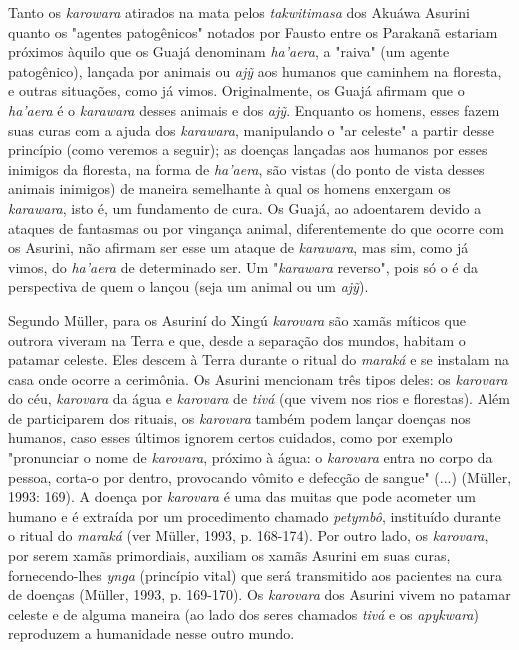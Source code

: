Tanto os \emph{karowara} atirados na mata pelos \emph{takwitimasa} dos
Akuáwa Asurini quanto os "agentes patogênicos" notados por Fausto entre
os Parakanã estariam próximos àquilo que os Guajá denominam
\emph{ha'aera}, a "raiva" (um agente patogênico), lançada por animais ou
\emph{ajỹ} aos humanos que caminhem na floresta, e outras situações,
como já vimos. Originalmente, os Guajá afirmam que o \emph{ha'aera} é o
\emph{karawara} desses animais e dos \emph{ajỹ}. Enquanto os homens,
esses fazem suas curas com a ajuda dos \emph{karawara}, manipulando o
"ar celeste" a partir desse princípio (como veremos a seguir); as
doenças lançadas aos humanos por esses inimigos da floresta, na forma de
\emph{ha'aera}, são vistas (do ponto de vista desses animais inimigos)
de maneira semelhante à qual os homens enxergam os \emph{karawara}, isto
é, um fundamento de cura. Os Guajá, ao adoentarem devido a ataques de
fantasmas ou por vingança animal, diferentemente do que ocorre com os
Asurini, não afirmam ser esse um ataque de \emph{karawara}, mas sim,
como já vimos, do \emph{ha'aera} de determinado ser. Um "\emph{karawara}
reverso", pois só o é da perspectiva de quem o lançou (seja um animal ou
um \emph{ajỹ}).

Segundo Müller, para os Asuriní do Xingú \emph{karovara} são xamãs
míticos que outrora viveram na Terra e que, desde a separação dos
mundos, habitam o patamar celeste. Eles descem à Terra durante o ritual
do \emph{maraká} e se instalam na casa onde ocorre a cerimônia. Os
Asurini mencionam três tipos deles: os \emph{karovara} do céu,
\emph{karovara} da água e \emph{karovara} de \emph{tivá} (que vivem nos
rios e florestas). Além de participarem dos rituais, os \emph{karovara}
também podem lançar doenças nos humanos, caso esses últimos ignorem
certos cuidados, como por exemplo "pronunciar o nome de \emph{karovara},
próximo à água: o \emph{karovara} entra no corpo da pessoa, corta-o por
dentro, provocando vômito e defecção de sangue" (...) (Müller, 1993:
169). A doença por \emph{karovara} é uma das muitas que pode acometer um
humano e é extraída por um procedimento chamado \emph{petymbô},
instituído durante o ritual do \emph{maraká} (ver Müller, 1993, p.
168-174). Por outro lado, os \emph{karovara}, por serem xamãs
primordiais, auxiliam os xamãs Asurini em suas curas, fornecendo-lhes
\emph{ynga} (princípio vital) que será transmitido aos pacientes na cura
de doenças (Müller, 1993, p. 169-170). Os \emph{karovara} dos Asurini
vivem no patamar celeste e de alguma maneira (ao lado dos seres chamados
\emph{tivá} e os \emph{apykwara}) reproduzem a humanidade nesse outro
mundo.

